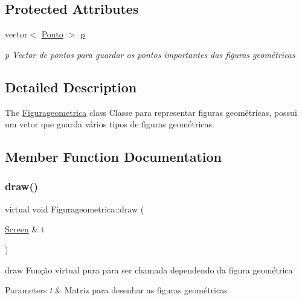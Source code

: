 \subsection*{Protected Attributes}
\begin{DoxyCompactItemize}
\item 
\mbox{\label{class_figurageometrica_a7fe8a9843c286befdf0b96871d6e0a4b}} 
vector$<$ \mbox{\hyperlink{class_ponto}{Ponto}} $>$ \mbox{\hyperlink{class_figurageometrica_a7fe8a9843c286befdf0b96871d6e0a4b}{p}}
\begin{DoxyCompactList}\small\item\em p Vector de pontos para guardar os pontos importantes das figuras geométricas \end{DoxyCompactList}\end{DoxyCompactItemize}


\subsection{Detailed Description}
The \mbox{\hyperlink{class_figurageometrica}{Figurageometrica}} class Classe para representar figuras geométricas, possui um vetor que guarda vários tipos de figuras geométricas. 

\subsection{Member Function Documentation}
\mbox{\label{class_figurageometrica_a68d9aba508879bb7a9ea1fe9d1d4f5f4}} 
\subsubsection{\texorpdfstring{draw()}{draw()}}
{\footnotesize\ttfamily virtual void Figurageometrica\+::draw (\begin{DoxyParamCaption}\item[{\mbox{\hyperlink{class_screen}{Screen}} \&}]{t }\end{DoxyParamCaption})\hspace{0.3cm}{\ttfamily [pure virtual]}}



draw Função virtual pura para ser chamada dependendo da figura geométrica 


\begin{DoxyParams}{Parameters}
{\em t} & Matriz para desenhar as figuras geométricas \\
\hline
\end{DoxyParams}



